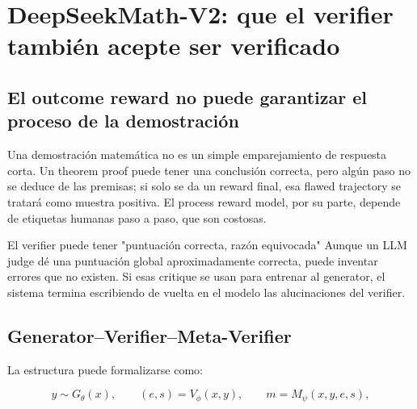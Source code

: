\section{DeepSeekMath-V2: que el verifier también acepte ser verificado}

\subsection{El outcome reward no puede garantizar el proceso de la demostración}



Una demostración matemática no es un simple emparejamiento de respuesta corta. Un theorem proof puede tener una conclusión correcta, pero algún paso no se deduce de las premisas; si solo se da un reward final, esa flawed trajectory se tratará como muestra positiva. El process reward model, por su parte, depende de etiquetas humanas paso a paso, que son costosas.

\begin{warningbox}{El verifier puede tener "puntuación correcta, razón equivocada"}
Aunque un LLM judge dé una puntuación global aproximadamente correcta, puede inventar errores que no existen. Si esas critique se usan para entrenar al generator, el sistema termina escribiendo de vuelta en el modelo las alucinaciones del verifier.
\end{warningbox}

\subsection{Generator--Verifier--Meta-Verifier}


La estructura puede formalizarse como:

$$
y\sim G_\theta(x),\qquad
(e,s)=V_\phi(x,y),\qquad
m=M_\psi(x,y,e,s),
$$

